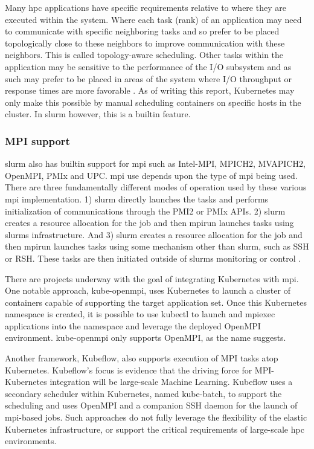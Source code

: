 \documentclass[12pt]{article}
\begin{document}
Many \gls{hpc} applications have specific requirements relative to where they are executed within the system. Where each task (rank) of an application may need to communicate with specific neighboring tasks and so prefer to be placed topologically close to these neighbors to improve communication with these neighbors. This is called topology-aware scheduling. Other tasks within the application may be sensitive to the performance of the I/O subsystem and as such may prefer to be placed in areas of the system where I/O throughput or response times are more favorable \cite{stackhpc-kubernetes-mpi}. As of writing this report, Kubernetes may only make this possible by manual scheduling containers on specific hosts in the cluster. In \gls{slurm} however, this is a builtin feature.

\subsubsection{MPI support}
\gls{slurm} also has builtin support for \gls{mpi} such as Intel-MPI, MPICH2, MVAPICH2, OpenMPI, PMIx and UPC. \gls{mpi} use depends upon the type of \gls{mpi} being used. There are three fundamentally different modes of operation used by these various \gls{mpi} implementation. 1) \gls{slurm} directly launches the tasks and performs initialization of communications through the PMI2 or PMIx APIs. 2) \gls{slurm} creates a resource allocation for the job and then mpirun launches tasks using \gls{slurm}s infrastructure. And 3) \gls{slurm} creates a resource allocation for the job and then mpirun launches tasks using some mechanism other than \gls{slurm}, such as SSH or RSH. These tasks are then initiated outside of \gls{slurm}s monitoring or control \cite{slurm-pmi}.

There are projects underway with the goal of integrating Kubernetes with \gls{mpi}. One notable approach, kube-openmpi, uses Kubernetes to launch a cluster of containers capable of supporting the target application set. Once this Kubernetes namespace is created, it is possible to use kubectl to launch and mpiexec applications into the namespace and leverage the deployed OpenMPI environment. kube-openmpi only supports OpenMPI, as the name suggests.

Another framework, Kubeflow, also supports execution of MPI tasks atop Kubernetes. Kubeflow’s focus is evidence that the driving force for MPI-Kubernetes integration will be large-scale Machine Learning. Kubeflow uses a secondary scheduler within Kubernetes, named kube-batch, to support the scheduling and uses OpenMPI and a companion SSH daemon for the launch of \gls{mpi}-based jobs. Such approaches do not fully leverage the flexibility of the elastic Kubernetes infrastructure, or support the critical requirements of large-scale \gls{hpc} environments.
\end{document}
